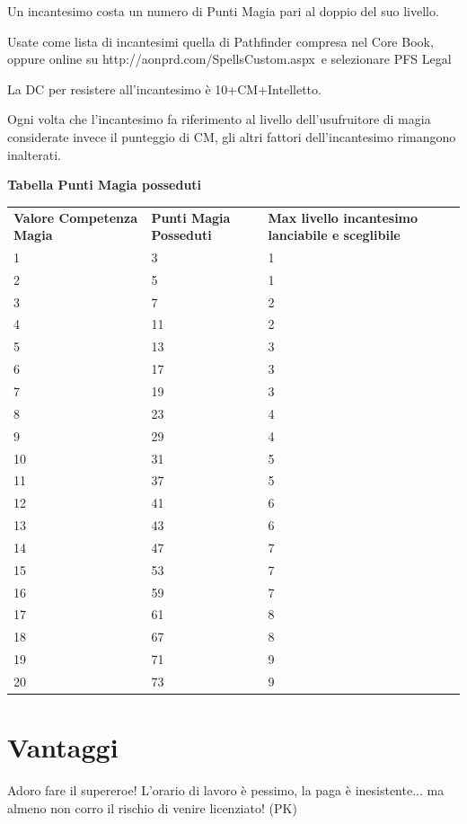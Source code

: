 \documentclass[a4paper,11pt,twoside,openany]{book}
\begin{document}
Un incantesimo costa un numero di Punti Magia pari al doppio del suo livello.

Usate come lista di incantesimi quella di Pathfinder compresa nel Core Book, oppure online su http://aonprd.com/SpellsCustom.aspx\ e selezionare PFS Legal

La DC per resistere all'incantesimo è 10+CM+Intelletto.

Ogni volta che l'incantesimo fa riferimento al livello dell'usufruitore di magia considerate invece il punteggio di CM, gli altri fattori dell'incantesimo rimangono inalterati.

\bigskip

\textbf{Tabella Punti Magia posseduti}

\bigskip

\begin{tabularx}{0.95\textwidth}{XXX}
	\toprule
	\textbf{Valore Competenza Magia} & \textbf{Punti Magia Posseduti} & \textbf{Max livello incantesimo lanciabile e sceglibile} \\
	1  & 3& 1\\
	2  & 5& 1\\
	3  & 7& 2\\
	4  & 11    & 2\\
	5  & 13    & 3\\
	6  & 17    & 3\\
	7  & 19    & 3\\
	8  & 23    & 4\\
	9  & 29    & 4\\
	10 & 31    & 5\\
	11 & 37    & 5\\
	12 & 41    & 6\\
	13 & 43    & 6\\
	14 & 47    & 7\\
	15 & 53    & 7\\
	16 & 59    & 7\\
	17 & 61    & 8\\
	18 & 67    & 8\\
	19 & 71    & 9\\
	20 & 73    & 9\\
\end{tabularx}

\pagebreak

\section{Vantaggi}

\label{vantaggi}
\begin{tcolorbox}[enhanced,arc=5pt,boxrule=0.3pt]{Adoro fare il supereroe! L'orario di lavoro è pessimo, la paga è inesistente... ma almeno non corro il rischio di venire licenziato! (PK)
	}\end{tcolorbox}\medskip
\end{document}
